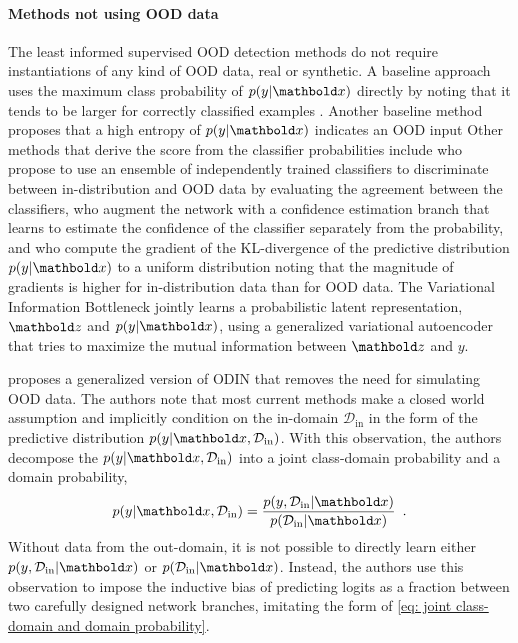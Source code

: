 \paragraph{Methods not using OOD data}
The least informed supervised OOD detection methods do not require instantiations of any kind of OOD data, real or synthetic. 
A baseline approach uses the maximum class probability of $p(y|\xb)$ directly by noting that it tends to be larger for correctly classified examples \cite{hendrycks_baseline_2017}. Another baseline method proposes that a high entropy of $p(y|\xb)$ indicates an OOD input \cite{ren_likelihood_2019} 
Other methods that derive the score from the classifier probabilities include \textcite{lakshminarayanan_simple_2017} who propose to use an ensemble of independently trained classifiers to discriminate between in-distribution and OOD data by evaluating the agreement between the classifiers, \textcite{devries_learning_2018} who augment the network with a confidence estimation branch that learns to estimate the confidence of the classifier separately from the probability, and \textcite{huang_importance_2021} who compute the gradient of the KL-divergence of the predictive distribution $p(y|\xb)$ to a uniform distribution noting that the magnitude of gradients is higher for in-distribution data than for OOD data. 
The Variational Information Bottleneck \cite{alemi_deep_2017} jointly learns a probabilistic latent representation, $\zb$ and $p(y|\xb)$, using a generalized variational autoencoder \cite{kingma_autoencoding_2014} that tries to maximize the mutual information between $\zb$ and $y$.

\textcite{hsu_generalized_2020} proposes a generalized version of ODIN that removes the need for simulating OOD data.
The authors note that most current methods make a closed world assumption and implicitly condition on the in-domain $\mathcal{D}_{\text{in}}$ in the form of the predictive distribution $p(y|\xb, \mathcal{D}_{\text{in}})$. With this observation, the authors decompose the $p(y|\xb, \mathcal{D}_{\text{in}})$ into a joint class-domain probability and a domain probability,
%
\begin{equation} \label{eq: joint class-domain and domain probability}
    p(y|\xb,\mathcal{D}_{\text{in}}) = \frac{p(y, \mathcal{D}_{\text{in}}|\xb)}{p(\mathcal{D}_{\text{in}}|\xb)} \enspace .
\end{equation}
%
Without data from the out-domain, it is not possible to directly learn either $p(y, \mathcal{D}_{\text{in}}|\xb)$ or $p(\mathcal{D}_{\text{in}}|\xb)$. Instead, the authors use this observation to impose the inductive bias of predicting logits as a fraction between two carefully designed network branches, imitating the form of \cref{eq: joint class-domain and domain probability}. 

